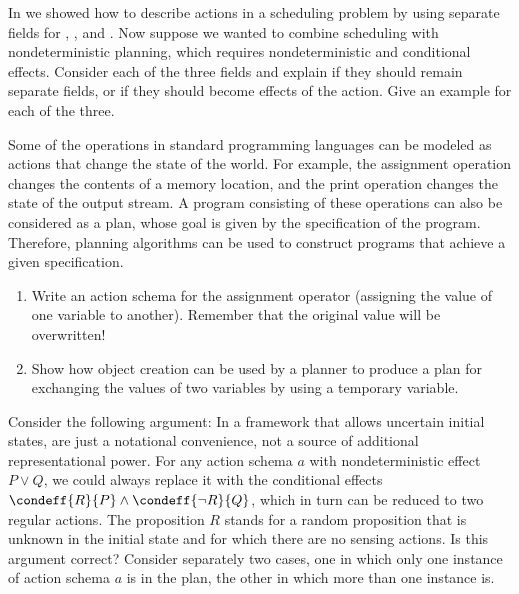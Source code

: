 
\begin{exercise} In  we showed how to
describe actions in a scheduling problem by using separate fields for
, , and .  Now suppose we
wanted to combine scheduling with nondeterministic planning, which
requires nondeterministic and conditional
effects.  Consider each of the three fields and explain if they should
remain separate fields, or if they should become effects of the
action. Give an example for each of the three.
\end{exercise} 

\begin{exercise}
Some of the operations in standard programming languages can be
modeled as actions that change the state of the world. For example,
the assignment operation changes the contents of a memory location,
and the print operation changes the state of the output stream.  A
program consisting of these operations can also be considered as a
plan, whose goal is given by the specification of the program.
Therefore, planning algorithms can be used to construct programs that
achieve a given specification.
\begin{enumerate}
\item Write an action schema for the assignment operator (assigning
the value of one variable to another). Remember that the original value will be overwritten!
\item Show how object creation can be used by a planner to produce a
plan for exchanging the values of two variables by using a temporary
variable.
\end{enumerate}
\end{exercise} 

\begin{iexercise} 
Consider the following argument: In a framework that allows uncertain
initial states,  are just a notational
convenience, not a source of additional representational power.  For
any action schema \(a\) with nondeterministic effect \(P \lor Q\), we could
always replace it with the conditional effects \(\condeff{R}{P} \land
\condeff{\lnot R}{Q}\), which in turn can be reduced to two regular
actions.  The proposition \(R\) stands for a random proposition that is
unknown in the initial state and for which there are no sensing
actions.  Is this argument correct?  Consider separately two cases,
one in which only one instance of action schema \(a\) is in the plan,
the other in which more than one instance is.
\end{iexercise} 

